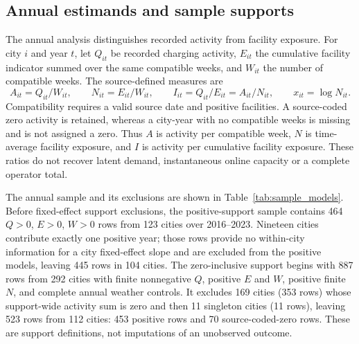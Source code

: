 \subsection{Annual estimands and sample supports}
\label{sec:si-annual-models}

The annual analysis distinguishes recorded activity from facility exposure.  For
city $i$ and year $t$, let $Q_{it}$ be recorded charging activity, $E_{it}$
the cumulative facility indicator summed over the same compatible weeks, and
$W_{it}$ the number of compatible weeks.  The source-defined measures are
\begin{equation}
 A_{it}=Q_{it}/W_{it},\qquad N_{it}=E_{it}/W_{it},\qquad
 I_{it}=Q_{it}/E_{it}=A_{it}/N_{it},\qquad x_{it}=\log N_{it}.
 \label{eq:si-definitions}
\end{equation}
Compatibility requires a valid source date and positive facilities.  A
source-coded zero activity is retained, whereas a city-year with no compatible
weeks is missing and is not assigned a zero.  Thus $A$ is activity per
compatible week, $N$ is time-average facility exposure, and $I$ is activity per
cumulative facility exposure.  These ratios do not recover latent demand,
instantaneous online capacity or a complete operator total.

The annual sample and its exclusions are shown in Table~\ref{tab:sample_models}.
Before fixed-effect support exclusions, the positive-support sample contains
464 $Q>0$, $E>0$, $W>0$ rows from 123 cities over 2016--2023.  Nineteen
cities contribute exactly one positive year; those rows provide no within-city
information for a city fixed-effect slope and are excluded from the positive
models, leaving 445 rows in 104 cities.  The zero-inclusive support begins
with 887 rows from 292 cities with finite nonnegative $Q$, positive $E$ and
$W$, positive finite $N$, and complete annual weather controls.  It excludes
169 cities (353 rows) whose support-wide activity sum is zero and then 11
singleton cities (11 rows), leaving 523 rows from 112 cities: 453 positive
rows and 70 source-coded-zero rows.  These are support definitions, not
imputations of an unobserved outcome.

